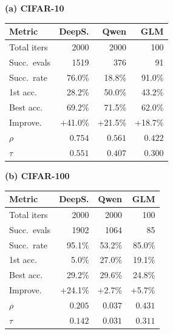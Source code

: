 \documentclass[10pt,twocolumn,letterpaper]{article}
\begin{document}
	\begin{table}[t]
		\centering
		\fontsize{7.5}{8.5}\selectfont
		\setlength{\tabcolsep}{4pt}
		
		\begin{minipage}[t]{0.32\textwidth}
			\centering
			\centerline{\textbf{(a) CIFAR-10}}
			\vspace{0.1cm}
			\begin{tabular}{lrrr}
				\toprule
				\textbf{Metric} & \textbf{DeepS.} & \textbf{Qwen} & \textbf{GLM} \\
				\midrule
				Total iters & 2000 & 2000 & 100 \\
				Succ.\ evals & 1519 & 376 & 91 \\
				Succ.\ rate & 76.0\% & 18.8\% & 91.0\% \\
				\midrule
				1st acc. & 28.2\% & 50.0\% & 43.2\% \\
				Best acc. & 69.2\% & 71.5\% & 62.0\% \\
				Improve. & +41.0\% & +21.5\% & +18.7\% \\
				\midrule
				$\rho$ & $0.754$ & $0.561$ & $0.422$ \\
				$\tau$ & $0.551$ & $0.407$ & $0.300$ \\
				\bottomrule
			\end{tabular}
		\end{minipage}
		\hfill
		\begin{minipage}[t]{0.32\textwidth}
			\centering
			\centerline{\textbf{(b) CIFAR-100}}
			\vspace{0.1cm}
			\begin{tabular}{lrrr}
				\toprule
				\textbf{Metric} & \textbf{DeepS.} & \textbf{Qwen} & \textbf{GLM} \\
				\midrule
				Total iters & 2000 & 2000 & 100 \\
				Succ.\ evals & 1902 & 1064 & 85 \\
				Succ.\ rate & 95.1\% & 53.2\% & 85.0\% \\
				\midrule
				1st acc. & 5.0\% & 27.0\% & 19.1\% \\
				Best acc. & 29.2\% & 29.6\% & 24.8\% \\
				Improve. & +24.1\% & +2.7\% & +5.7\% \\
				\midrule
				$\rho$ & $0.205$ & $0.037$ & $0.431$ \\
				$\tau$ & $0.142$ & $0.031$ & $0.311$ \\
				\bottomrule
			\end{tabular}
		\end{minipage}

\end{table}
\end{document}
